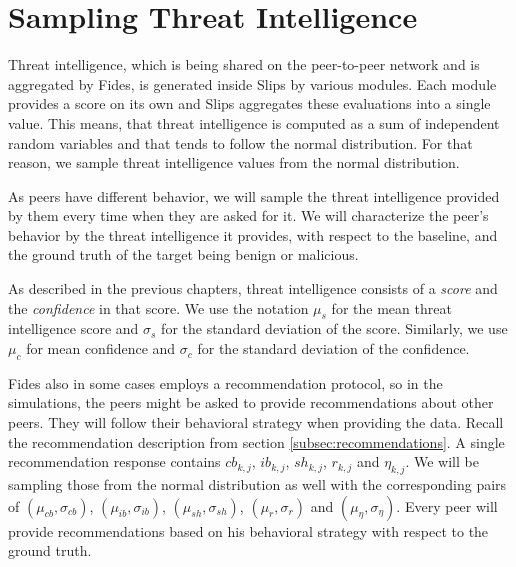 \section{Sampling Threat Intelligence}
\label{sec:sampling-threat-intelligence}
Threat intelligence, which is being shared on the peer-to-peer network and is aggregated by Fides, is generated inside Slips by various modules.
Each module provides a score on its own and Slips aggregates these evaluations into a single value. 
This means, that threat intelligence is computed as a sum of independent random variables and that tends to follow the normal distribution. 
For that reason, we sample threat intelligence values from the normal distribution.

As peers have different behavior, we will sample the threat intelligence provided by them every time when they are asked for it.
We will characterize the peer's behavior by the threat intelligence it provides, with respect to the baseline, and the ground truth of the target being benign or malicious.

As described in the previous chapters, threat intelligence consists of a \textit{score} and the \textit{confidence} in that score.
We use the notation $\mu_{s}$ for the mean threat intelligence score and $\sigma_{s}$ for the standard deviation of the score. 
Similarly, we use $\mu_{c}$ for mean confidence and $\sigma_{c}$ for the standard deviation of the confidence. 

Fides also in some cases employs a recommendation protocol, so in the simulations, the peers might be asked to provide recommendations about other peers.
They will follow their behavioral strategy when providing the data. 
Recall the recommendation description from section \ref{subsec:recommendations}. A single recommendation response contains $cb_{k,j}$, $ib_{k,j}$, $sh_{k,j}$, $r_{k,j}$ and $\eta_{k,j}$. 
We will be sampling those from the normal distribution as well with the corresponding pairs of $(\mu_{cb}, \sigma_{cb})$, $(\mu_{ib}, \sigma_{ib})$, $(\mu_{sh}, \sigma_{sh})$, $(\mu_{r}, \sigma_{r})$ and $(\mu_{\eta}, \sigma_{\eta})$.
Every peer will provide recommendations based on his behavioral strategy with respect to the ground truth.

